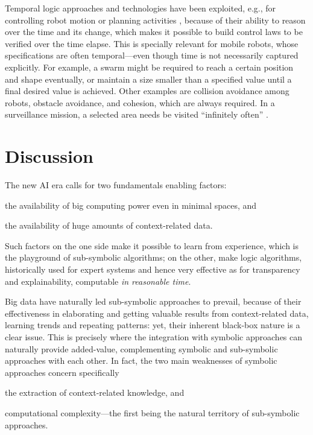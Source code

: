 \documentclass[12pt,a4paper,openright,twoside]{book}
\begin{document}
Temporal logic approaches and technologies have been exploited, e.g., for controlling robot motion or planning activities \cite{finucane2010,fainekos2009}, because of their ability to reason over the time and its change, which makes it possible to build control laws to be verified over the time elapse.
%
This is specially relevant for mobile robots, whose specifications are often temporal---even though time is not necessarily captured explicitly.
%
For example, a swarm might be required to reach a certain position and shape eventually, or maintain a size smaller than a specified value until a final desired value is achieved.
%
Other examples are collision avoidance among robots, obstacle avoidance, and cohesion, which are always required.
%
In a surveillance mission, a selected area needs be visited ``infinitely often'' \cite{Kloetzer2007}.

\section{Discussion}

The new AI era calls for two fundamentals enabling factors:
%
\begin{inlinelist}
    \item the availability of big computing power even in minimal spaces, and
    \item the availability of huge amounts of context-related data.
\end{inlinelist}
%
Such factors on the one side make it possible to learn from experience, which is the playground of sub-symbolic algorithms; on the other, make logic algorithms, historically used for expert systems and hence very effective as for transparency and explainability, computable \emph{in reasonable time}.

Big data have naturally led sub-symbolic approaches to prevail, because of their effectiveness in elaborating and getting valuable results from context-related data, learning trends and repeating patterns: yet, their inherent black-box nature is a clear issue.
%
This is precisely where the integration with symbolic approaches can naturally provide added-value, complementing symbolic and sub-symbolic approaches with each other.
%
In fact, the two main weaknesses of symbolic approaches concern specifically
%
\begin{inlinelist}
    \item the extraction of context-related knowledge, and
    \item computational complexity---the first being the natural territory of sub-symbolic approaches.
\end{inlinelist}
\end{document}
